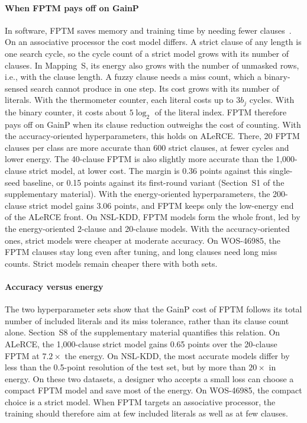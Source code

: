\documentclass[preprint,review,12pt]{elsarticle}
\newcommand{\gainp}{GainP}
\newcommand{\wosnew}[1]{#1}   %
\begin{document}
\paragraph{When FPTM pays off on \gainp{}}
In software, FPTM saves memory and training time by needing fewer clauses~\cite{hnilov2025fptm}.
On an associative processor the cost model differs.
A strict clause of any length is one search \wosnew{cycle}, so the \wosnew{cycle count} of a strict model grows with its number of clauses. \wosnew{In Mapping~S, its energy also grows with the number of unmasked rows, i.e., with the clause length.}
A fuzzy clause needs a miss count, which a binary-sensed search cannot produce in one step.
Its cost grows with its number of literals. With the thermometer counter, each literal costs up to $3b_j$ cycles. With the binary counter, it costs about $5\log_2$ of the literal index.
FPTM therefore pays off on \gainp{} when its clause reduction outweighs the cost of counting.
\wosnew{With the accuracy-oriented hyperparameters, this holds on ALeRCE.} There, 20 FPTM clauses per class are more accurate than 600 strict clauses, at fewer cycles and lower energy.
The 40-clause FPTM is also slightly more accurate than the 1,000-clause strict model, at lower cost. \wosnew{The margin is 0.36 points against this single-seed baseline, or 0.15 points against its first-round variant (Section~S1 of the supplementary material).}
\wosnew{With the energy-oriented hyperparameters, the 200-clause strict model gains 3.06 points, and FPTM keeps only the low-energy end of the ALeRCE front.
On NSL-KDD, FPTM models form the whole front, led by the energy-oriented 2-clause and 20-clause models. With the accuracy-oriented ones, strict models were cheaper at moderate accuracy.
On WOS-46985, the FPTM clauses stay long even after tuning, and long clauses need long miss counts. Strict models remain cheaper there with both sets.}

\wosnew{\paragraph{Accuracy versus energy}
The two hyperparameter sets show that the \gainp{} cost of FPTM follows its total number of included literals and its miss tolerance, rather than its clause count alone. Section~S8 of the supplementary material quantifies this relation.
On ALeRCE, the 1,000-clause strict model gains 0.65 points over the 20-clause FPTM at $7.2\times$ the energy.
On NSL-KDD, the most accurate models differ by less than the 0.5-point resolution of the test set, but by more than $20\times$ in energy.
On these two datasets, a designer who accepts a small loss can choose a compact FPTM model and save most of the energy.
On WOS-46985, the compact choice is a strict model.
When FPTM targets an associative processor, the training should therefore aim at few included literals as well as at few clauses.}
\end{document}
